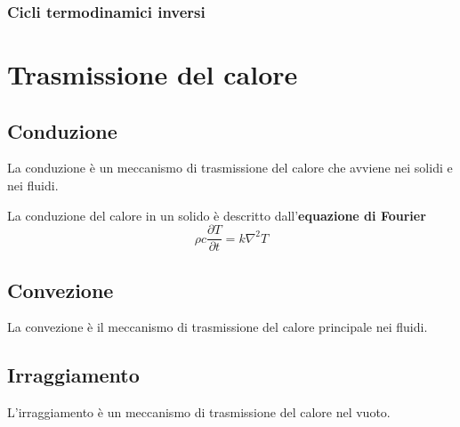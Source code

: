 \subsection{Cicli termodinamici inversi}

\chapter{Trasmissione del calore}\label{ch:heat-transmission}
\section{Conduzione}
La conduzione è un meccanismo di trasmissione del calore che avviene nei solidi e nei fluidi.

\noindent
La conduzione del calore in un solido è descritto dall'\textbf{equazione di Fourier}
\begin{equation}
    \rho c \dfrac{\partial T}{\partial t} = k \nabla^2 T
\end{equation}
\section{Convezione}
La convezione è il meccanismo di trasmissione del calore principale nei fluidi.
\section{Irraggiamento}
L'irraggiamento è un meccanismo di trasmissione del calore nel vuoto.
